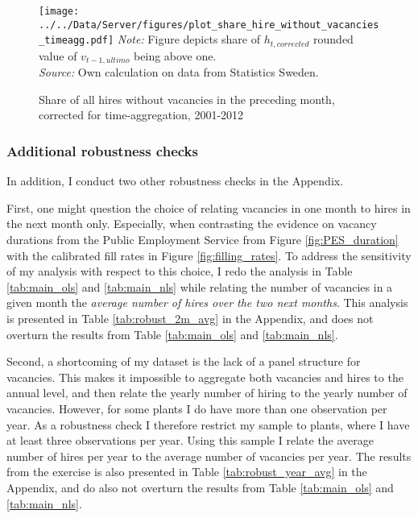 \begin{figure}[t]
\centering
\caption{Share of all hires without vacancies in the preceding month, corrected for time-aggregation, 2001-2012}
\texttt{[image: ../../Data/Server/figures/plot\_share\_hire\_without\_vacancies\_timeagg.pdf]}
\flushleft
\footnotesize{\emph{Note:} Figure depicts share of $h_{t,corrected}$ rounded value of $v_{t-1,ultimo}$ being above one.} \\
\footnotesize{\emph{Source:} Own calculation on data from Statistics Sweden.}
\label{fig:share_without_timeagg}
\end{figure}

\FloatBarrier




\subsubsection{Additional robustness checks}

In addition, I conduct two other robustness checks in the Appendix. 

First, one might question the choice of relating vacancies in one month to hires in the next month only. Especially, when contrasting the evidence on vacancy durations from the Public Employment Service from Figure \ref{fig:PES_duration} with the calibrated fill rates in Figure \ref{fig:filling_rates}. To address the sensitivity of my analysis with respect to this choice, I redo the analysis in Table \ref{tab:main_ols} and \ref{tab:main_nls} while relating the number of vacancies in a given month the \emph{average number of hires over the two next months}. This analysis is presented in Table \ref{tab:robust_2m_avg} in the Appendix, and does not overturn the results from Table \ref{tab:main_ols} and \ref{tab:main_nls}.

Second, a shortcoming of my dataset is the lack of a panel structure for vacancies. This makes it impossible to aggregate both vacancies and hires to the annual level, and then relate the yearly number of hiring to the yearly number of vacancies. However, for some plants I do have more than one observation per year. As a robustness check I therefore restrict my sample to plants, where I have at least three observations per year. Using this sample I relate the average number of hires per year to the average number of vacancies per year. The results from the exercise is also presented in Table \ref{tab:robust_year_avg} in the Appendix, and do also not overturn the results from Table \ref{tab:main_ols} and \ref{tab:main_nls}.